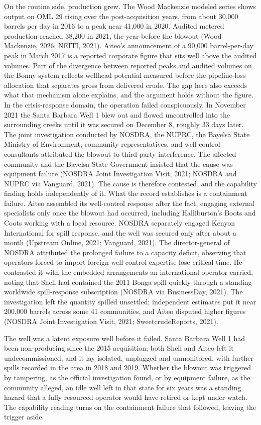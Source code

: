 \documentclass[twoside,fontset=lmodern]{mitthesis}
\begin{document}
On the routine side, production grew. The Wood Mackenzie modeled series
shows output on OML 29 rising over the post-acquisition years, from
about 30,000 barrels per day in 2016 to a peak near 41,000 in 2020.
Audited metered production reached 38,200 in 2021, the year before the
blowout (Wood Mackenzie, 2026; NEITI, 2021). Aiteo's announcement of a
90,000 barrel-per-day peak in March 2017 is a reported corporate figure
that sits well above the audited volumes. Part of the divergence between
reported peaks and audited volumes on the Bonny system reflects wellhead
potential measured before the pipeline-loss allocation that separates
gross from delivered crude. The gap here also exceeds what that
mechanism alone explains, and the argument holds without the figure. In
the crisis-response domain, the operation failed conspicuously. In
November 2021 the Santa Barbara Well 1 blew out and flowed uncontrolled
into the surrounding creeks until it was secured on December 8, roughly
33 days later. The joint investigation conducted by NOSDRA, the NUPRC,
the Bayelsa State Ministry of Environment, community representatives,
and well-control consultants attributed the blowout to third-party
interference. The affected community and the Bayelsa State Government
insisted that the cause was equipment failure (NOSDRA Joint
Investigation Visit, 2021; NOSDRA and NUPRC via Vanguard, 2021). The
cause is therefore contested, and the capability finding holds
independently of it. What the record establishes is a containment
failure. Aiteo assembled its well-control response after the fact,
engaging external specialists only once the blowout had occurred,
including Halliburton's Boots and Coots working with a local resource.
NOSDRA separately engaged Kenyon International for spill response, and
the well was secured only after about a month (Upstream Online, 2021;
Vanguard, 2021). The director-general of NOSDRA attributed the prolonged
failure to a capacity deficit, observing that operators forced to import
foreign well-control expertise lose critical time. He contrasted it with
the embedded arrangements an international operator carried, noting that
Shell had contained the 2011 Bonga spill quickly through a standing
worldwide spill-response subscription (NOSDRA via BusinessDay, 2021).
The investigation left the quantity spilled unsettled; independent
estimates put it near 200,000 barrels across some 41 communities, and
Aiteo disputed higher figures (NOSDRA Joint Investigation Visit, 2021;
SweetcrudeReports, 2021).

The well was a latent exposure well before it failed. Santa Barbara Well
1 had been non-producing since the 2015 acquisition; both Shell and
Aiteo left it undecommissioned, and it lay isolated, unplugged and
unmonitored, with further spills recorded in the area in 2018 and 2019.
Whether the blowout was triggered by tampering, as the official
investigation found, or by equipment failure, as the community alleged,
an idle well left in that state for six years was a standing hazard that
a fully resourced operator would have retired or kept under watch. The
capability reading turns on the containment failure that followed,
leaving the trigger aside.
\end{document}
